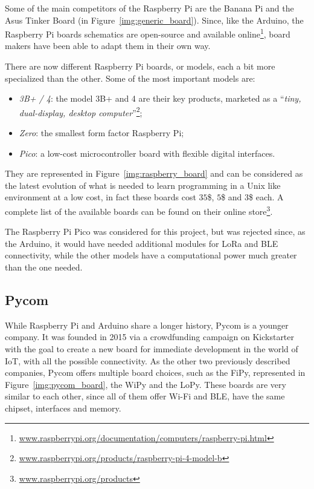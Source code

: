 			Some of the main competitors of the Raspberry Pi are the Banana Pi and the Asus Tinker Board (in Figure~\ref{img:generic_board}).
			Since, like the Arduino, the Raspberry Pi boards schematics are open-source and available online\footnote{ \url{www.raspberrypi.org/documentation/computers/raspberry-pi.html}}, board makers have been able to adapt them in their own way.
	
			There are now different Raspberry Pi boards, or models, each a bit more specialized than the other.
			Some of the most important models are:
			\begin{itemize}
				\item \textit{3B+ / 4}: the model 3B+ and 4 are their key products, marketed as a ``\textit{tiny, dual-display, desktop computer}''\footnote{ \url{www.raspberrypi.org/products/raspberry-pi-4-model-b}};
				\item \textit{Zero}: the smallest form factor Raspberry Pi;
				\item \textit{Pico}: a low-cost microcontroller board with flexible digital interfaces.
			\end{itemize}
			
			They are represented in Figure~\ref{img:raspberry_board} and can be considered as the latest evolution of what is needed to learn programming in a Unix like environment at a low cost, in fact these boards cost $35$\$, $5$\$ and $3$\$ each.
			A complete list of the available boards can be found on their online store\footnote{ \url{www.raspberrypi.org/products}}.
			
			The Raspberry Pi Pico was considered for this project, but was rejected since, as the Arduino, it would have needed additional modules for LoRa and BLE connectivity, while the other models have a computational power much greater than the one needed.
				
		\subsection{Pycom}
			
			While Raspberry Pi and Arduino share a longer history, Pycom is a younger company.
			It was founded in 2015 via a crowdfunding campaign on Kickstarter with the goal to create a new board for immediate development in the world of IoT, with all the possible connectivity.
			As the other two previously described companies, Pycom offers multiple board choices, such as the FiPy, represented in Figure~\ref{img:pycom_board}, the WiPy and the LoPy.
			These boards are very similar to each other, since all of them offer Wi-Fi and BLE, have the same chipset, interfaces and memory.
			
